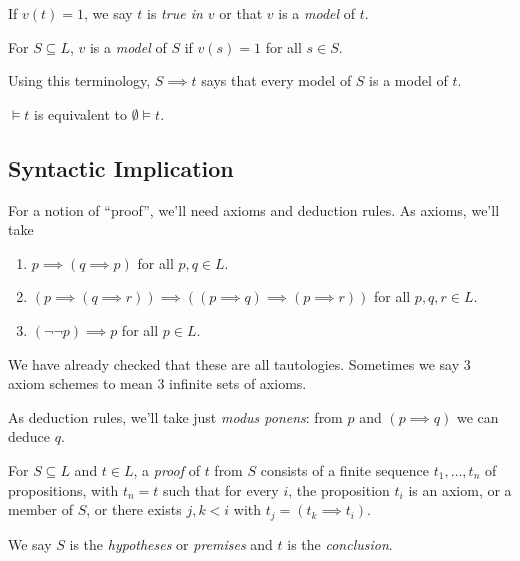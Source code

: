 \documentclass[a4paper]{article}
\begin{document}
\begin{definition}[Model]
  If \(v(t) = 1\), we say \(t\) is \emph{true in \(v\)} or that \(v\) is a \emph{model} of \(t\).

  For \(S \subseteq L\), \(v\) is a \emph{model} of \(S\) if \(v(s) = 1\) for all \(s \in S\).
\end{definition}

Using this terminology, \(S \implies t\) says that every model of \(S\) is a model of \(t\).

\begin{note}
  \(\models t\) is equivalent to \(\emptyset \models t\).
\end{note}

\subsection{Syntactic Implication}

For a notion of ``proof'', we'll need axioms and deduction rules. As axioms, we'll take
\begin{enumerate}
\item \(p \implies (q \implies p)\) for all \(p, q \in L\).
\item \((p \implies (q \implies r)) \implies ((p \implies q) \implies (p \implies r))\) for all \(p, q, r \in L\).
\item \((\neg \neg p) \implies p\) for all \(p \in L\).
\end{enumerate}

\begin{note}
  We have already checked that these are all tautologies. Sometimes we say 3 axiom schemes to mean 3 infinite sets of axioms.
\end{note}

As deduction rules, we'll take just \emph{modus ponens}: from \(p\) and \((p \implies q)\) we can deduce \(q\).

\begin{definition}[Proof]
  For \(S \subseteq L\) and \(t \in L\), a \emph{proof} of \(t\) from \(S\) consists of a finite sequence \(t_1, \dots, t_n\) of propositions, with \(t_n = t\) such that for every \(i\), the proposition \(t_i\) is an axiom, or a member of \(S\), or there exists \(j, k < i\) with \(t_j = (t_k \implies t_i)\).

  We say \(S\) is the \emph{hypotheses} or \emph{premises} and \(t\) is the \emph{conclusion}.
\end{definition}
\end{document}

